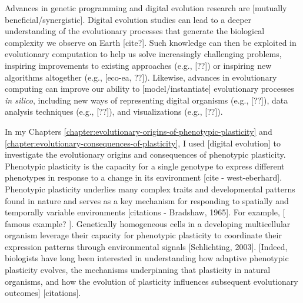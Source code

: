 Advances in genetic programming and digital evolution research are [mutually beneficial/synergistic].
Digital evolution studies can lead to a deeper understanding of the evolutionary processes that generate the biological complexity we observe on Earth [cite?].
Such knowledge can then be exploited in evolutionary computation to help us solve increasingly challenging problems, inspiring improvements to existing approaches (e.g., [??]) or inspiring new algorithms altogether (e.g., [eco-ea, ??]).  
Likewise, advances in evolutionary computing can improve our ability to [model/instantiate] evolutionary processes \textit{in silico}, including new ways of representing digital organisms (e.g., [??]), data analysis techniques (e.g., [??]), and visualizations (e.g., [??]).

In my Chapters \ref{chapter:evolutionary-origins-of-phenotypic-plasticity} and \ref{chapter:evolutionary-consequences-of-plasticity}, I used [digital evolution] to investigate the evolutionary origins and consequences of phenotypic plasticity.
Phenotypic plasticity is the capacity for a single genotype to express different phenotypes in response to a change in its environment [cite - west-eberhard].
Phenotypic plasticity underlies many complex traits and developmental patterns found in nature and serves as a key mechanism for responding to spatially and temporally variable environments [citations - Bradshaw, 1965].
For example, [ famous example? ].
Genetically homogeneous cells in a developing multicellular organism leverage their capacity for phenotypic plasticity to coordinate their expression patterns through environmental signals [Schlichting, 2003].
[Indeed, biologists have long been interested in understanding how adaptive phenotypic plasticity evolves, the mechanisms underpinning that plasticity in natural organisms, and how the evolution of plasticity influences subsequent evolutionary outcomes] [citations].


